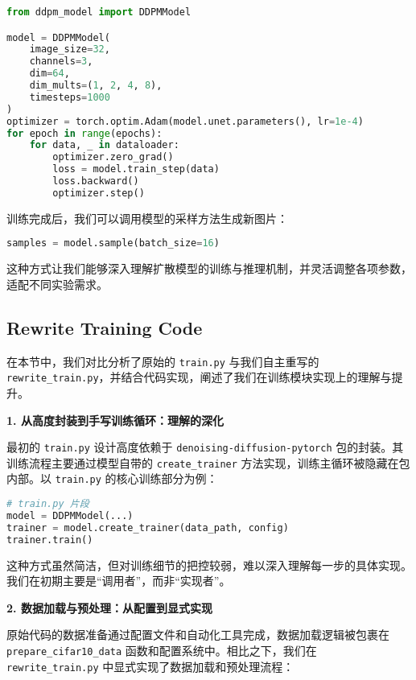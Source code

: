 \documentclass{ctexart}
\begin{document}
\begin{lstlisting}[language=python]
from ddpm_model import DDPMModel

model = DDPMModel(
    image_size=32,
    channels=3,
    dim=64,
    dim_mults=(1, 2, 4, 8),
    timesteps=1000
)
optimizer = torch.optim.Adam(model.unet.parameters(), lr=1e-4)
for epoch in range(epochs):
    for data, _ in dataloader:
        optimizer.zero_grad()
        loss = model.train_step(data)
        loss.backward()
        optimizer.step()
\end{lstlisting}

训练完成后，我们可以调用模型的采样方法生成新图片：

\begin{lstlisting}[language=python]
samples = model.sample(batch_size=16)
\end{lstlisting}

这种方式让我们能够深入理解扩散模型的训练与推理机制，并灵活调整各项参数，适配不同实验需求。


\subsection{Rewrite Training Code}

在本节中，我们对比分析了原始的 \texttt{train.py} 与我们自主重写的 \texttt{rewrite\_train.py}，并结合代码实现，阐述了我们在训练模块实现上的理解与提升。

\vspace{0.5em}
\noindent
\textbf{1. 从高度封装到手写训练循环：理解的深化}

最初的 \texttt{train.py} 设计高度依赖于 \texttt{denoising-diffusion-pytorch} 包的封装。其训练流程主要通过模型自带的 \texttt{create\_trainer} 方法实现，训练主循环被隐藏在包内部。以 \texttt{train.py} 的核心训练部分为例：

\begin{lstlisting}[language=python]
# train.py 片段
model = DDPMModel(...)
trainer = model.create_trainer(data_path, config)
trainer.train()
\end{lstlisting}

这种方式虽然简洁，但对训练细节的把控较弱，难以深入理解每一步的具体实现。我们在初期主要是“调用者”，而非“实现者”。

\vspace{0.5em}
\noindent
\textbf{2. 数据加载与预处理：从配置到显式实现}

原始代码的数据准备通过配置文件和自动化工具完成，数据加载逻辑被包裹在 \texttt{prepare\_cifar10\_data} 函数和配置系统中。相比之下，我们在 \texttt{rewrite\_train.py} 中显式实现了数据加载和预处理流程：
\end{document}
